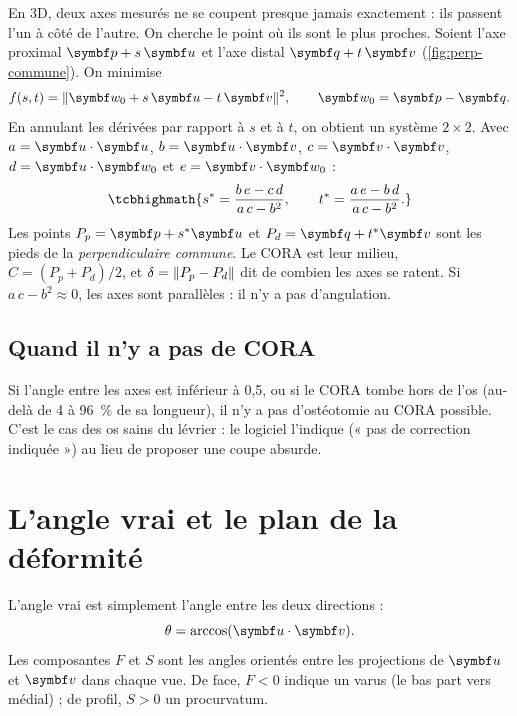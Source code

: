 En 3D, deux axes mesurés ne se coupent presque jamais exactement : ils passent l'un à côté de l'autre. On cherche le
point où ils sont le plus proches. Soient l'axe proximal $\vb{p} + s\,\vb{u}$ et l'axe distal $\vb{q} + t\,\vb{v}$
(\cref{fig:perp-commune}). On minimise
\begin{equation}
  f(s, t) = \norm{\vb{w}_0 + s\,\vb{u} - t\,\vb{v}}^2, \qquad \vb{w}_0 = \vb{p} - \vb{q}.
\end{equation}
En annulant les dérivées par rapport à $s$ et à $t$, on obtient un système $2 \times 2$. Avec $a = \vb{u}\cdot\vb{u}$,
$b = \vb{u}\cdot\vb{v}$, $c = \vb{v}\cdot\vb{v}$, $d = \vb{u}\cdot\vb{w}_0$ et $e = \vb{v}\cdot\vb{w}_0$ :
\begin{equation}
  \tcbhighmath{s^* = \frac{b\,e - c\,d}{a\,c - b^2}, \qquad t^* = \frac{a\,e - b\,d}{a\,c - b^2}.}
  \label{eq:perp}
\end{equation}
Les points $P_p = \vb{p} + s^*\vb{u}$ et $P_d = \vb{q} + t^*\vb{v}$ sont les pieds de la \emph{perpendiculaire
commune}. Le CORA est leur milieu, $C = (P_p + P_d)/2$, et $\delta = \lVert P_p - P_d\rVert$ dit de combien les axes se
ratent. Si $a\,c - b^2 \approx 0$, les axes sont parallèles : il n'y a pas d'angulation.


\subsection{Quand il n'y a pas de CORA}

Si l'angle entre les axes est inférieur à 0,5\degre, ou si le CORA tombe hors de l'os (au-delà de 4 à 96~\% de sa
longueur), il n'y a pas d'ostéotomie au CORA possible. C'est le cas des os sains du lévrier : le logiciel l'indique
(« pas de correction indiquée ») au lieu de proposer une coupe absurde.

\section{L'angle vrai et le plan de la déformité}
\label{sec:angle-vrai}

L'angle vrai est simplement l'angle entre les deux directions :
\begin{equation}
  \theta = \arccos(\vb{u}\cdot\vb{v}).
\end{equation}
Les composantes $F$ et $S$ sont les angles orientés entre les projections de $\vb{u}$ et $\vb{v}$ dans chaque vue. De
face, $F < 0$ indique un varus (le bas part vers médial) ; de profil, $S > 0$ un procurvatum.

